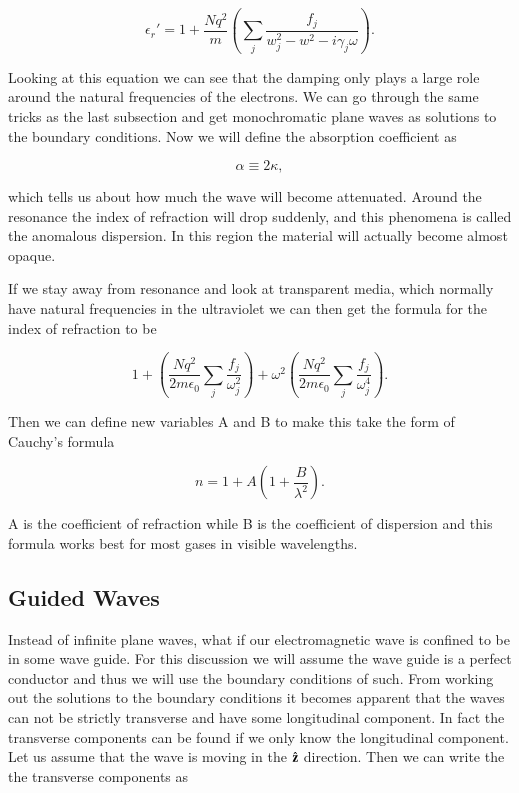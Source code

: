 \documentclass[preprint, review,12pt]{elsarticle}
\def\b{\textbf}
\def\={\equiv}
\def\9{\left(}
\def\0{\right)}
\newcommand{\hb}[1]{\hat{\b #1}}
\begin{document}
\begin{equation}
    \epsilon_r' = 1 + \frac{Nq^2}{m} \9 \sum_j \frac{f_j}{w_j^2 - w^2 - i \gamma_j \omega} \0.
\end{equation}

Looking at this equation we can see that the damping only plays a large role around the natural frequencies of the electrons. We can go through the same tricks as the last subsection and get monochromatic plane waves as solutions to the boundary conditions. Now we will define the absorption coefficient as 

\begin{equation}
    \alpha \= 2 \kappa,
\end{equation}

which tells us about how much the wave will become attenuated. Around the resonance the index of refraction will drop suddenly, and this phenomena is called the anomalous dispersion. In this region the material will actually become almost opaque.

If we stay away from resonance and look at transparent media, which normally have natural frequencies in the ultraviolet we can then get the formula for the index of refraction to be 

\begin{equation}
    1 + \9 \frac{Nq^2}{2m\epsilon_0} \sum_j \frac{f_j}{\omega_j^2} \0  + \omega^2 \9 \frac{Nq^2}{2m\epsilon_0} \sum_j \frac{f_j}{\omega_j^4} \0.
\end{equation}

Then we can define new variables A and B to make this take the form of Cauchy's formula

\begin{equation}
    n = 1 + A \9 1 + \frac{B}{\lambda^2} \0.
\end{equation}

A is the coefficient of refraction while B is the coefficient of dispersion and this formula works best for most gases in visible wavelengths.

\subsection{Guided Waves}

Instead of infinite plane waves, what if our electromagnetic wave is confined to be in some wave guide. For this discussion we will assume the wave guide is a perfect conductor and thus we will use the boundary conditions of such. From working out the solutions to the boundary conditions it becomes apparent that the waves can not be strictly transverse and have some longitudinal component. In fact the transverse components can be found if we only know the longitudinal component. Let us assume that the wave is moving in the $\hb z$ direction. Then we can write the the transverse components as 
\end{document}
